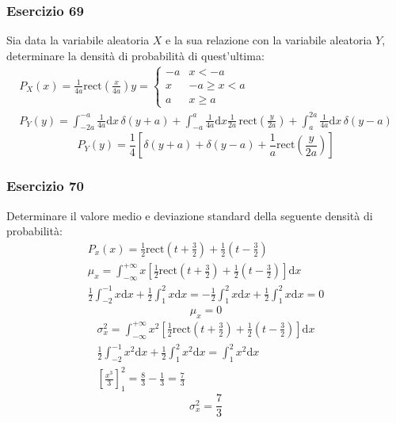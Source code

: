 \documentclass{article}
\newcommand{\rect}{\mathrm{rect}}
\newcommand{\df}{\mathrm{d}}
\begin{document}
\subsubsection*{Esercizio 69}

Sia data la variabile aleatoria $X$ e la sua relazione con la variabile aleatoria $Y$, determinare la densità di probabilità di quest'ultima:
\begin{gather*}
    P_X(x)=\frac{1}{4a}\rect\left(\frac{x}{4a}\right)
    y=\begin{cases}
        -a&x<-a\\
        x&-a\geq x<a\\
        a&x\geq a
    \end{cases}\\
    P_Y(y)=\displaystyle\int_{-2a}^{-a}\frac{1}{4a}\df x\,\delta(y+a)+\int_{-a}^a\frac{1}{4a}\df x\frac{1}{2a}\,\rect\left(\frac{y}{2a}\right)+\int_{a}^{2a}\frac{1}{4a}\df x\,\delta(y-a)
\end{gather*}
\begin{equation}
    P_Y(y)=\displaystyle\frac{1}{4}\left[\delta(y+a)+\delta(y-a)+\frac{1}{a}\rect\left(\frac{y}{2a}\right)\right]
\end{equation}

\subsubsection*{Esercizio 70}

Determinare il valore medio e deviazione standard della seguente densità di probabilità:
\begin{gather*}
    P_x(x)=\displaystyle\frac{1}{2}\rect\left({t+\frac{3}{2}}\right)+\frac{1}{2}\left({t-\frac{3}{2}}\right)\\
    \mu_x=\displaystyle\int_{-\infty}^{+\infty}x\left[\frac{1}{2}\rect\left({t+\frac{3}{2}}\right)+\frac{1}{2}\left({t-\frac{3}{2}}\right)\right]\df x\\
    \displaystyle\frac{1}{2}\int_{-2}^{-1}x\df x+\frac{1}{2}\int_{1}^2x\df x=-\frac{1}{2}\int_1^2x\df x+\frac{1}{2}\int_1^2x\df x=0
\end{gather*}
\begin{equation}
    \mu_x=0
\end{equation}
\begin{gather*}
    \sigma_x^2=\displaystyle\int_{-\infty}^{+\infty}x^2\left[\frac{1}{2}\rect\left({t+\frac{3}{2}}\right)+\frac{1}{2}\left({t-\frac{3}{2}}\right)\right]\df x\\
    \displaystyle\frac{1}{2}\int_{-2}^{-1}x^2\df x+\frac{1}{2}\int_1^2x^2\df x=\int_1^2x^2\df x\\
    \displaystyle\left[\frac{x^3}{3}\right]_1^2=\frac{8}{3}-\frac{1}{3}=\frac{7}{3}
\end{gather*}
\begin{equation}
    \sigma_x^2=\displaystyle\frac{7}{3}
\end{equation}
\end{document}
